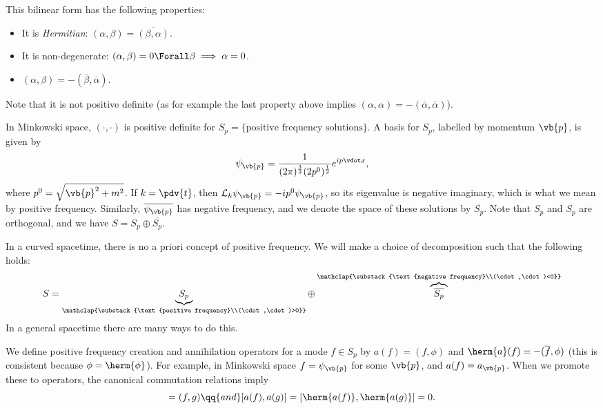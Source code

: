 \documentclass{jknotes}
\begin{document}
This bilinear form has the following properties:
\begin{itemize}
    \item It is \emph{Hermitian}: \((\alpha,\beta)=\overline{(\beta,\alpha)}\).
    \item It is non-degenerate: \((\alpha,\beta) = 0 \Forall \beta \implies \alpha=0\).
    \item \((\alpha,\beta) = - (\overline{\beta},\overline{\alpha})\).
\end{itemize}
Note that it is not positive definite (as for example the last property above implies \((\alpha,\alpha) = - (\overline{\alpha},\overline{\alpha})\)).

In Minkowski space, \((\cdot,\cdot)\) is positive definite for \(S_p=\{\text{positive frequency solutions}\}\). A basis for \(S_p\), labelled by momentum \(\vb{p}\), is given by
\begin{equation}
    \psi_{\vb{p}} = \frac{1}{(2\pi)^{\frac{3}{2}}(2p^0)^{\frac{1}{2}}}e^{ip\vdot x},
\end{equation}
where \(p^0 = \sqrt{\vb{p}^2+m^2}\). If \(k=\pdv{t}\), then \(\mathcal{L}_k\psi_{\vb{p}}=-ip^0\psi_{\vb{p}}\), so its eigenvalue is negative imaginary, which is what we mean by positive frequency. Similarly, \(\overline{\psi_{\vb{p}}}\) has negative frequency, and we denote the space of these solutions by \(\overline{S_p}\). Note that \(S_p\) and \(\overline{S_p}\) are orthogonal, and we have \(S=S_p\oplus\overline{S_p}\).

In a curved spacetime, there is no a priori concept of positive frequency. We will make a choice of decomposition such that the following holds:
\begin{equation}
    S = \underbrace{S_p}_{\mathclap{\substack{\text{positive frequency}\\(\cdot,\cdot)>0}}}
    \oplus
    \overbrace{\overline{S_p}}^{\mathclap{\substack{\text{negative frequency}\\(\cdot,\cdot)<0}}}
\end{equation}
In a general spacetime there are many ways to do this.

We define positive frequency creation and annihilation operators for a mode \(f\in S_p\) by \(a(f) = (f,\phi)\) and \(\herm{a}(f) = -(\overline{f},\phi)\) (this is consistent because \(\phi=\herm{\phi}\)). For example, in Minkowski space \(f=\psi_{\vb{p}}\) for some \(\vb{p}\), and \(a(f) = a_{\vb{p}}\). When we promote these to operators, the canonical commutation relations imply
\begin{equation}
    [a(f),\herm{a(g)}] = (f,g) \qq{and} [a(f),a(g)]=[\herm{a(f)},\herm{a(g)}] = 0.
\end{equation}
\end{document}

